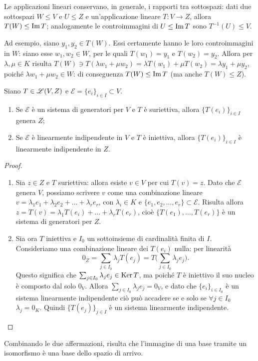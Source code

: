 \begin{osservazione} \label{o:applicazioni-sottospazi}
	Le applicazioni lineari conservano, in generale, i rapporti tra sottospazi: dati due sottospazi $W\le V$ e $U\le Z$ e un'applicazione lineare $T\colon V\to Z$, allora $T(W)\leq \operatorname{Im} T$; analogamente le controimmagini di $U\le \operatorname{Im} T$ sono $T^{-1}(U)\leq V$.

	Ad esempio, siano $y_1,y_2\in T(W)$.
	Essi certamente hanno le loro controimmagini in $W$: siano esse $w_1,w_2\in W$, per le quali $T(w_1)=y_1$ e $T(w_2)=y_2$.
	Allora per $\lambda,\mu\in K$ risulta $T(W)\ni T(\lambda w_1+\mu w_2)=\lambda T(w_1)+\mu T(w_2)=\lambda y_1+\mu y_2$, poiché $\lambda w_1+\mu w_2\in W$: di conseguenza $T(W)\le\operatorname{Im} T$ (ma anche $T(W)\le Z$).
\end{osservazione}

\begin{teorema}
	Siano $T\in\mathscr L(V,Z)$ e $\mathcal E=\{e_i\}_{i\in I}\subset V$.
	\begin{enumerate}
		\item Se $\mathcal E$ è un sistema di generatori per $V$ e $T$ è suriettiva, allora $\{T(e_i)\}_{i\in I}$ genera $Z$;
		\item Se $\mathcal E$ è linearmente indipendente in $V$ e $T$ è iniettiva, allora $\{T(e_i)\}_{i\in I}$ è linearmente indipendente in $Z$.
	\end{enumerate}
\end{teorema}
\begin{proof}
	\begin{enumerate}
		\item Sia $z\in Z$ e $T$ suriettiva: allora esiste $v\in V$ per cui $T(v)=z$.
			Dato che $\mathcal E$ genera $V$, possiamo scrivere $v$ come una combinazione lineare $v=\lambda_1e_1+\lambda_2e_2+\dots+\lambda_re_r$, con $\lambda_i\in K$ e $\{e_1,e_2,\dots,e_r\}\subset\mathcal E$.
			Risulta allora $z=T(v)=\lambda_1T(e_i)+\dots+\lambda_rT(e_r)$, cioè $\{T(e_1),\dots,T(e_r)\}$ è un sistema di generatori per $Z$.
		\item Sia ora $T$ iniettiva e $I_0$ un sottoinsieme di cardinalità finita di $I$.
			Consideriamo una combinazione lineare dei $T(e_i)$ nulla: per linearità
			\begin{equation*}
				0_Z=\sum_{j\in I_0}\lambda_jT(e_j)=T\bigg(\sum_{j\in I_0}\lambda_je_j\bigg).
			\end{equation*}
			Questo significa che $\sum_{j\in I_0}\lambda_je_j\in\operatorname{Ker} T$, ma poiché $T$ è iniettivo il suo nucleo è composto dal solo $0_V$.
			Allora $\sum_{j\in I_0}\lambda_je_j=0_V$, e dato che $\{e_i\}_{i\in I_0}$ è un sistema linearmente indipendente ciò può accadere se e solo se $\forall j\in I_0$ $\lambda_j=0_K$.
			Quindi $\{T(e_j)\}_{j\in I}$ è un sistema linearmente indipendente.\qedhere
	\end{enumerate}
\end{proof}
Combinando le due affermazioni, risulta che l'immagine di una base tramite un isomorfismo è una base dello spazio di arrivo.

